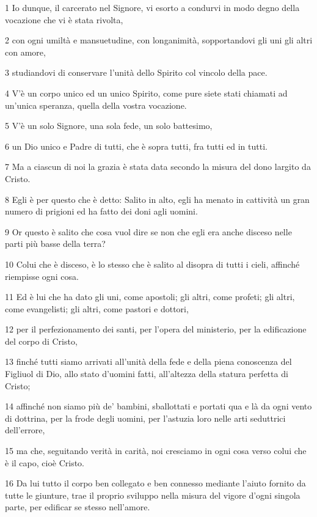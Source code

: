 \par 1 Io dunque, il carcerato nel Signore, vi esorto a condurvi in modo degno della vocazione che vi è stata rivolta,
\par 2 con ogni umiltà e mansuetudine, con longanimità, sopportandovi gli uni gli altri con amore,
\par 3 studiandovi di conservare l'unità dello Spirito col vincolo della pace.
\par 4 V'è un corpo unico ed un unico Spirito, come pure siete stati chiamati ad un'unica speranza, quella della vostra vocazione.
\par 5 V'è un solo Signore, una sola fede, un solo battesimo,
\par 6 un Dio unico e Padre di tutti, che è sopra tutti, fra tutti ed in tutti.
\par 7 Ma a ciascun di noi la grazia è stata data secondo la misura del dono largito da Cristo.
\par 8 Egli è per questo che è detto: Salito in alto, egli ha menato in cattività un gran numero di prigioni ed ha fatto dei doni agli uomini.
\par 9 Or questo è salito che cosa vuol dire se non che egli era anche disceso nelle parti più basse della terra?
\par 10 Colui che è disceso, è lo stesso che è salito al disopra di tutti i cieli, affinché riempisse ogni cosa.
\par 11 Ed è lui che ha dato gli uni, come apostoli; gli altri, come profeti; gli altri, come evangelisti; gli altri, come pastori e dottori,
\par 12 per il perfezionamento dei santi, per l'opera del ministerio, per la edificazione del corpo di Cristo,
\par 13 finché tutti siamo arrivati all'unità della fede e della piena conoscenza del Figliuol di Dio, allo stato d'uomini fatti, all'altezza della statura perfetta di Cristo;
\par 14 affinché non siamo più de' bambini, sballottati e portati qua e là da ogni vento di dottrina, per la frode degli uomini, per l'astuzia loro nelle arti seduttrici dell'errore,
\par 15 ma che, seguitando verità in carità, noi cresciamo in ogni cosa verso colui che è il capo, cioè Cristo.
\par 16 Da lui tutto il corpo ben collegato e ben connesso mediante l'aiuto fornito da tutte le giunture, trae il proprio sviluppo nella misura del vigore d'ogni singola parte, per edificar se stesso nell'amore.
